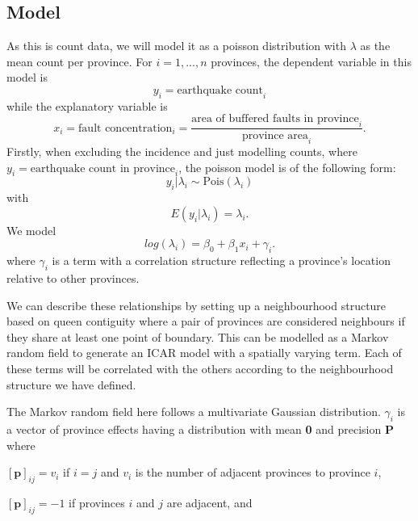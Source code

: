\hypertarget{model}{%
\subsection{Model}\label{model}}

As this is count data, we will model it as a poisson distribution with
\(\lambda\) as the mean count per province. For \(i = 1,...,n\) provinces,
the dependent variable in this model is
\begin{equation}
y_i = \text{earthquake count}_i 
\label{eq:eq1}
\end{equation}
while the explanatory variable is
\begin{equation}
x_i = \text{fault concentration}_i = \frac{\text{area of buffered faults in province}_i} {\text{province area}_i}.
\label{eq:eq2}
\end{equation}
Firstly, when excluding the incidence and just modelling counts, where
\(y_i = \text{earthquake count in province}_i\), the poisson model is of
the following form:
\begin{equation}
y_i | \lambda_i \sim \text{Pois}(\lambda_i)
\label{eq:eq3}
\end{equation}
with
\begin{equation}
E(y_i | \lambda_i) = \lambda_i.
\label{eq:eq4}
\end{equation}
We model
\begin{equation}
log(\lambda_i) = \beta_0 + \beta_1x_i + \gamma_i.
\label{eq:eq5}
\end{equation}
where \(\gamma_i\)
is a term with a correlation structure reflecting a province's location
relative to other provinces.

We can describe these relationships by setting up a neighbourhood
structure based on queen contiguity where a pair of provinces are
considered neighbours if they share at least one point of boundary. This can be modelled as a Markov random field to generate an ICAR model with a spatially varying term. Each of these terms will be correlated with the others according to the neighbourhood structure we have defined.

The Markov random field here follows a multivariate Gaussian
distribution. \(\gamma_i\) is a vector of province effects having a
distribution with mean \textbf{0} and precision \textbf{P} where

\([\textbf{p}]_{ij} = v_i\) if \(i=j\) and \(v_i\) is the number of adjacent provinces
to province \(i\),

\([\textbf{p}]_{ij} = -1\) if provinces \(i\) and \(j\) are adjacent, and

